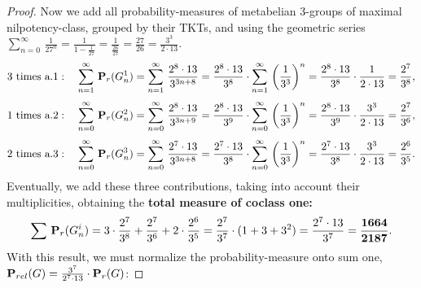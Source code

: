 \documentclass{amsart}
\theoremstyle{definition}
\theoremstyle{remark}
\begin{document}
\begin{proof}
\noindent
Now we add all probability-measures
of metabelian \(3\)-groups of maximal nilpotency-class,
grouped by their TKTs,
and using the geometric series
\(\sum_{n=0}^{\infty}\,\frac{1}{27^n}
=\frac{1}{1-\frac{1}{27}}
=\frac{1}{\frac{26}{27}}
=\frac{27}{26}
=\frac{3^3}{2\cdot 13}\).
\begin{equation}
\label{eqn:a1}
3 \text{ times a.1}: \quad
\sum_{n=1}^{\infty}\,{\bf P}_r(G_n^1)=
\sum_{n=1}^{\infty}\,\frac{2^8\cdot 13}{3^{3n+8}}=
\frac{2^8\cdot 13}{3^{8}}\cdot\sum_{n=1}^{\infty}\,\left(\frac{1}{3^3}\right)^n=
\frac{2^8\cdot 13}{3^{8}}\cdot\frac{1}{2\cdot 13}=
\frac{2^7}{3^8},
\end{equation}
\begin{equation}
\label{eqn:a2}
1 \text{ times a.2}: \quad
\sum_{n=0}^{\infty}\,{\bf P}_r(G_n^2)=
\sum_{n=0}^{\infty}\,\frac{2^8\cdot 13}{3^{3n+9}}=
\frac{2^8\cdot 13}{3^{9}}\cdot\sum_{n=0}^{\infty}\,\left(\frac{1}{3^3}\right)^n=
\frac{2^8\cdot 13}{3^{9}}\cdot\frac{3^3}{2\cdot 13}=
\frac{2^7}{3^6},
\end{equation}
\begin{equation}
\label{eqn:a3}
2 \text{ times a.3}: \quad
\sum_{n=0}^{\infty}\,{\bf P}_r(G_n^3)=
\sum_{n=0}^{\infty}\,\frac{2^7\cdot 13}{3^{3n+8}}=
\frac{2^7\cdot 13}{3^{8}}\cdot\sum_{n=0}^{\infty}\,\left(\frac{1}{3^3}\right)^n=
\frac{2^7\cdot 13}{3^{8}}\cdot\frac{3^3}{2\cdot 13}=
\frac{2^6}{3^5}.
\end{equation}
Eventually, we add these three contributions,
taking into account their multiplicities, obtaining the 
\textbf{total measure of coclass one:}
\begin{equation}
\label{eqn:cc1}
\sum\,{\bf P}_{r}(G_n^i)=
3\cdot\frac{2^7}{3^8}+\frac{2^7}{3^6}+2\cdot\frac{2^6}{3^5}=
\frac{2^7}{3^7}\cdot(1+3+3^2)=
\frac{2^7\cdot 13}{3^7}=
\frac{\bf 1664}{\bf 2187}.
\end{equation}
With this result, we must normalize the probability-measure onto sum one, \({\bf P}_{rel}(G)=\frac{3^7}{2^7\cdot 13}\cdot{\bf P}_{r}(G)\):


\end{proof}
\end{document}
